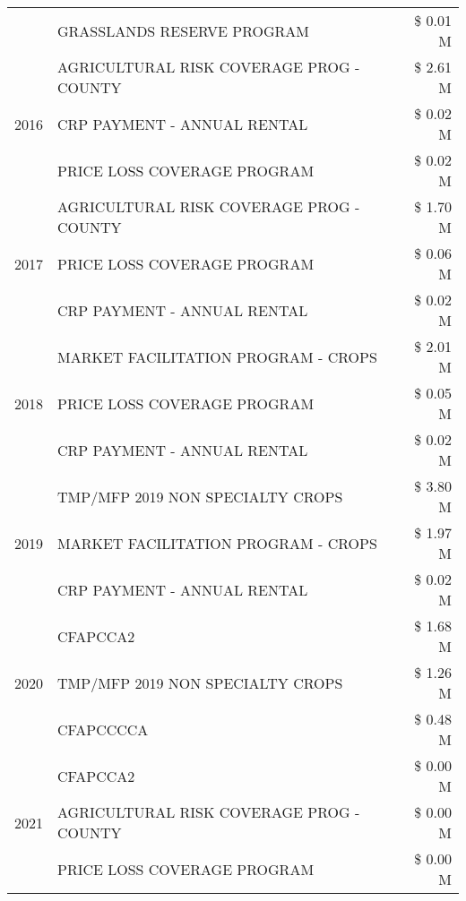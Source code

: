 \begin{tabular}{llr}
 & GRASSLANDS RESERVE PROGRAM & \$ 0.01 M \\
\cline{1-3}
\multirow[t]{3}{*}{2016} & AGRICULTURAL RISK COVERAGE PROG - COUNTY & \$ 2.61 M \\
 & CRP PAYMENT - ANNUAL RENTAL & \$ 0.02 M \\
 & PRICE LOSS COVERAGE PROGRAM & \$ 0.02 M \\
\cline{1-3}
\multirow[t]{3}{*}{2017} & AGRICULTURAL RISK COVERAGE PROG - COUNTY & \$ 1.70 M \\
 & PRICE LOSS COVERAGE PROGRAM & \$ 0.06 M \\
 & CRP PAYMENT - ANNUAL RENTAL & \$ 0.02 M \\
\cline{1-3}
\multirow[t]{3}{*}{2018} & MARKET FACILITATION PROGRAM - CROPS & \$ 2.01 M \\
 & PRICE LOSS COVERAGE PROGRAM & \$ 0.05 M \\
 & CRP PAYMENT - ANNUAL RENTAL & \$ 0.02 M \\
\cline{1-3}
\multirow[t]{3}{*}{2019} & TMP/MFP 2019 NON SPECIALTY CROPS & \$ 3.80 M \\
 & MARKET FACILITATION PROGRAM - CROPS & \$ 1.97 M \\
 & CRP PAYMENT - ANNUAL RENTAL & \$ 0.02 M \\
\cline{1-3}
\multirow[t]{3}{*}{2020} & CFAPCCA2 & \$ 1.68 M \\
 & TMP/MFP 2019 NON SPECIALTY CROPS & \$ 1.26 M \\
 & CFAPCCCCA & \$ 0.48 M \\
\cline{1-3}
\multirow[t]{3}{*}{2021} & CFAPCCA2 & \$ 0.00 M \\
 & AGRICULTURAL RISK COVERAGE PROG - COUNTY & \$ 0.00 M \\
 & PRICE LOSS COVERAGE PROGRAM & \$ 0.00 M \\
\cline{1-3}
\bottomrule
\end{tabular}
